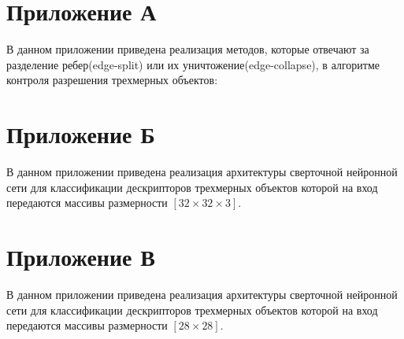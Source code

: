 \documentclass[14pt]{article}
\numberwithin{figure}{section}
\numberwithin{equation}{section}
\begin{document}
\newpage
{}
\label{attachA}\section*{Приложение А}

В данном приложении приведена реализация методов, которые отвечают за разделение ребер(edge-split) или их уничтожение(edge-collapse), в алгоритме контроля разрешения трехмерных объектов:



\newpage
{}
\section*{Приложение Б}

В данном приложении приведена реализация архитектуры сверточной нейронной сети для классификации дескрипторов трехмерных объектов которой на вход передаются массивы размерности $[32 \times 32 \times 3]$.

 

\newpage
{}
\section*{Приложение В}

В данном приложении приведена реализация архитектуры сверточной нейронной сети для классификации дескрипторов трехмерных объектов которой на вход передаются массивы размерности $[28 \times 28]$.



\end{document}
